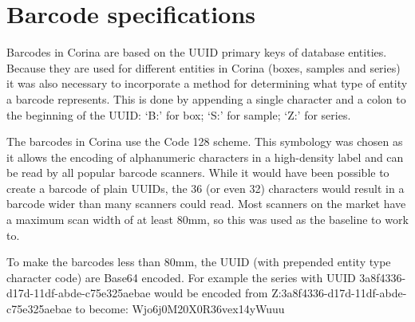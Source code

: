 \section{Barcode specifications}
\label{txt:barcodeSpecs}
Barcodes in Corina are based on the UUID primary keys of database entities.  Because they are used for different entities in Corina (boxes, samples and series) it was also necessary to incorporate a method for determining what type of entity a barcode represents. This is done by appending a single character and a colon to the beginning of the UUID: `B:' for box; `S:' for sample; `Z:' for series.

The barcodes in Corina use the Code 128 scheme. This symbology was chosen as it allows the encoding of alphanumeric characters in a high-density label and can be read by all popular barcode scanners. While it would have been possible to create a barcode of plain UUIDs, the 36 (or even 32) characters would result in a barcode wider than many scanners could read. Most scanners on the market have a maximum scan width of at least 80mm, so this was used as the baseline to work to.

To make the barcodes less than 80mm, the UUID (with prepended entity type character code) are Base64 encoded. For example the series with UUID 3a8f4336-d17d-11df-abde-c75e325aebae would be encoded from Z:3a8f4336-d17d-11df-abde-c75e325aebae to become: Wjo6j0M20X0R36vex14yWuuu 